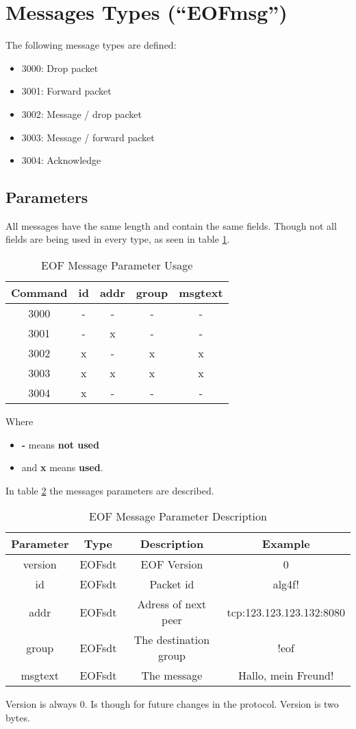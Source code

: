 \section{Messages Types ("`EOFmsg"')}
\label{eofmsg}
The following message types are defined:

\begin{itemize}
\item 3000: Drop packet
\item 3001: Forward packet
\item 3002: Message / drop packet
\item 3003: Message / forward packet
\item 3004: Acknowledge
\end{itemize}
\subsection{Parameters}
All messages have the same length and contain the same fields.
Though not all fields are being used in every type, as seen in table
\ref{eofmessageparameteroverview}.
\begin{longtable}{|c|c|c|c|c|}
\caption{EOF Message Parameter Usage}
\label{eofmessageparameteroverview}
\\
\hline
\textbf{Command} & \textbf{id} & \textbf{addr} & \textbf{group} & \textbf{msgtext}\\
\hline
3000 & - & - & - & - \\
\hline
3001 & - & x & - & - \\
\hline
3002 & x & - & x & x \\
\hline
3003 & x & x & x & x \\
\hline
3004 & x & - & - & -\\
\hline
\end{longtable}
Where 
\begin{itemize}
\item \textbf{-} means \textbf{not used}
\item and \textbf{x} means \textbf{used}.
\end{itemize}
In table \ref{eofmessagedescription} the messages
parameters are described.
\begin{longtable}{|c|c|c|c|}
\caption{EOF Message Parameter Description}
\label{eofmessagedescription}
\\
\hline
\textbf{Parameter} & \textbf{Type} & \textbf{Description} & \textbf{Example}\\
\hline
version & EOFsdt & EOF Version & 0\\
\hline
id & EOFsdt & Packet id & alg4f!\\
\hline
addr & EOFsdt & Adress of next peer & tcp:123.123.123.132:8080\\
\hline
group & EOFsdt & The destination group & !eof\\
\hline
msgtext & EOFsdt & The message & Hallo, mein Freund!\\
\hline
\end{longtable}
Version is always 0. Is though for future changes in the protocol.
Version is two bytes.
